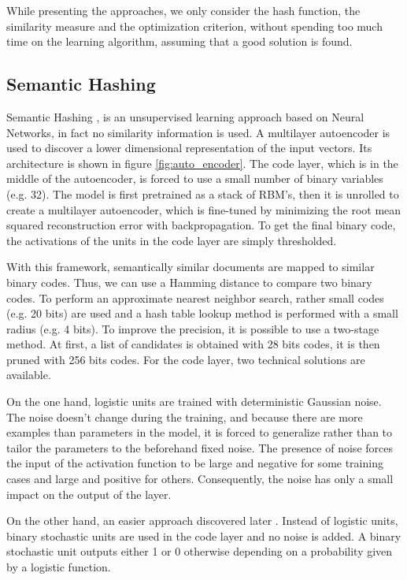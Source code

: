While presenting the approaches, we only consider the hash function, the similarity measure and the optimization criterion, without spending too much time on the learning algorithm, assuming that a good solution is found.

\subsection{Semantic Hashing}
Semantic Hashing \cite{salakhutdinov2007semantic},\cite{salakhutdinov2009semantic} is an unsupervised learning approach based on Neural Networks, in fact no similarity information is used. A multilayer autoencoder is used to discover a lower dimensional representation of the input vectors. Its architecture is shown in figure \ref{fig:auto_encoder}. The code layer, which is in the middle of the autoencoder, is forced to use a small number of binary variables (e.g. 32). The model is first pretrained as a stack of RBM's, then it is unrolled to create a multilayer autoencoder, which is fine-tuned by minimizing the root mean squared reconstruction error with backpropagation. To get the final binary code, the activations of the units in the code layer are simply thresholded.

With this framework, semantically similar documents are mapped to similar binary codes. Thus, we can use a Hamming distance to compare two binary codes. To perform an approximate nearest neighbor search, rather small codes (e.g. 20 bits) are used and a hash table lookup method is performed with a small radius (e.g. 4 bits). To improve the precision, it is possible to use a two-stage method. At first, a list of candidates is obtained with 28 bits codes, it is then pruned with 256 bits codes. For the code layer, two technical solutions are available.

On the one hand, logistic units are trained with deterministic Gaussian noise. The noise doesn't change during the training, and because there are more examples than parameters in the model, it is forced to generalize rather than to tailor the parameters to the beforehand fixed noise. The presence of noise forces the input of the activation function to be large and negative for some training cases and large and positive for others. Consequently, the noise has only a small impact on the output of the layer.

On the other hand, an easier approach discovered later \cite{krizhevsky2011using}. Instead of logistic units, binary stochastic units are used in the code layer and no noise is added. A binary stochastic unit outputs either 1 or 0 otherwise depending on a probability given by a logistic function.

